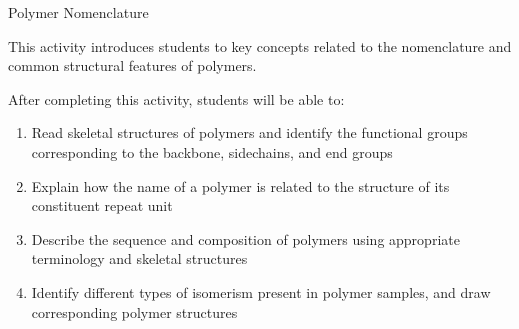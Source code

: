 %
%
%
%

\renewcommand{\figpath}{content/intro/nomenclature/figs}
\renewcommand{\labelbase}{nomenclature}

\begin{activity}{Polymer Nomenclature}

\begin{instructornotes}

	This activity introduces students to key concepts related to the nomenclature and common structural features of polymers.
	
	After completing this activity, students will be able to:
			\begin{enumerate}
				\item Read skeletal structures of polymers and identify the functional groups corresponding to the backbone, sidechains, and end groups
				\item Explain how the name of a polymer is related to the structure of its constituent repeat unit
				\item Describe the sequence and composition of polymers using appropriate terminology and skeletal structures
				\item Identify different types of isomerism present in polymer samples, and draw corresponding polymer structures
			\end{enumerate}
			

\end{instructornotes}
\end{activity}
